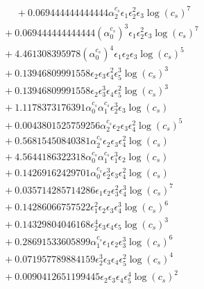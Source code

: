 \documentclass[10pt]{article}
\begin{document}
\begin{align*}
\phantom{F_{s,7}} &\phantom{={}}{}  + 0.069444444444444 \alpha_{2}^{c_s} \epsilon_{1} \epsilon_{2}^{2} \epsilon_{3} \log{\left(c_{s} \right)}^{7} \\
&{}  + 0.069444444444444 \left(\alpha_{0}^{c_s}\right)^{3} \epsilon_{1} \epsilon_{2}^{2} \epsilon_{3} \log{\left(c_{s} \right)}^{7} \\
&{}  + 4.461308395978 \left(\alpha_{0}^{c_s}\right)^{4} \epsilon_{1} \epsilon_{2} \epsilon_{3} \log{\left(c_{s} \right)}^{5} \\
&{}  + 0.13946809991558 \epsilon_{2} \epsilon_{3} \epsilon_{4}^{2} \epsilon_{5}^{3} \log{\left(c_{s} \right)}^{3} \\
&{}  + 0.13946809991558 \epsilon_{2} \epsilon_{3}^{3} \epsilon_{4} \epsilon_{5}^{2} \log{\left(c_{s} \right)}^{3} \\
&{}  + 1.1178373176391 \alpha_{0}^{c_s} \alpha_{1}^{c_s} \epsilon_{2}^{3} \epsilon_{3} \log{\left(c_{s} \right)} \\
&{}  + 0.0043801525759256 \alpha_{2}^{c_s} \epsilon_{2} \epsilon_{3} \epsilon_{4}^{2} \log{\left(c_{s} \right)}^{5} \\
&{}  + 0.56815450840381 \alpha_{2}^{c_s} \epsilon_{2} \epsilon_{3} \epsilon_{4}^{2} \log{\left(c_{s} \right)} \\
&{}  + 4.5644186322318 \alpha_{0}^{c_s} \alpha_{1}^{c_s} \epsilon_{1}^{3} \epsilon_{2} \log{\left(c_{s} \right)} \\
&{}  + 0.14269162429701 \alpha_{0}^{c_s} \epsilon_{2}^{3} \epsilon_{3} \epsilon_{4}^{2} \log{\left(c_{s} \right)} \\
&{}  + 0.035714285714286 \epsilon_{1} \epsilon_{2} \epsilon_{3}^{2} \epsilon_{4}^{3} \log{\left(c_{s} \right)}^{7} \\
&{}  + 0.14286066757522 \epsilon_{1}^{2} \epsilon_{2} \epsilon_{3} \epsilon_{4}^{3} \log{\left(c_{s} \right)}^{6} \\
&{}  + 0.14329804046168 \epsilon_{2}^{4} \epsilon_{3} \epsilon_{4} \epsilon_{5} \log{\left(c_{s} \right)}^{3} \\
&{}  + 0.28691533605899 \alpha_{1}^{c_s} \epsilon_{1} \epsilon_{2} \epsilon_{3}^{3} \log{\left(c_{s} \right)}^{6} \\
&{}  + 0.071957789884159 \epsilon_{2}^{3} \epsilon_{3} \epsilon_{4} \epsilon_{5}^{2} \log{\left(c_{s} \right)}^{4} \\
&{}  + 0.0090412651199445 \epsilon_{2} \epsilon_{3} \epsilon_{4} \epsilon_{5}^{4} \log{\left(c_{s} \right)}^{2} \\

\end{align*}
\end{document}

